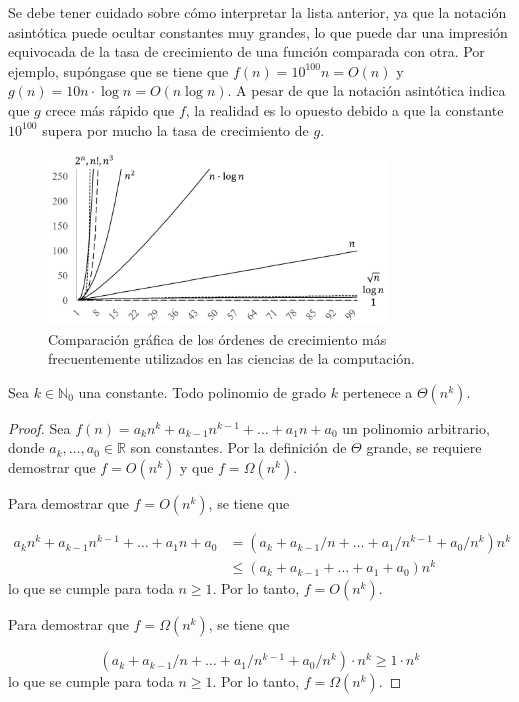 Se debe tener cuidado sobre cómo interpretar la lista anterior, ya
que la notación asintótica puede ocultar constantes muy grandes, lo
que puede dar una impresión equivocada de la tasa de crecimiento
de una función comparada con otra. 
Por ejemplo, supóngase que se tiene que $f(n)=10^{100}n=O(n)$
y $g(n)=10n\cdot\log n=O(n\log n)$. A pesar de que la notación
asintótica indica que $g$ crece más rápido que $f$, la realidad
es lo opuesto debido a que la constante $10^{100}$ supera por mucho 
la tasa de crecimiento de $g$.

\begin{figure}[tb]
    \begin{centering}
        \includegraphics[width=0.8\textwidth]{figuras/ordenes}
    \par\end{centering}
    \caption{{\small{}Comparación gráfica de los órdenes de crecimiento más frecuentemente
    utilizados en las ciencias de la computación.}}
\end{figure}

\begin{thm}
    Sea $k\in\mathbb{N}_{0}$ una constante. Todo polinomio de grado $k$
    pertenece a $\Theta(n^{k})$.
\end{thm}

\begin{proof}
    Sea $f(n)=a_{k}n^{k}+a_{k-1}n^{k-1}+\dots+a_{1}n+a_{0}$ un polinomio
    arbitrario, donde $a_k,\dots,a_{0}\in\mathbb{R}$ son constantes.
    Por la definición de $\Theta$ grande, se requiere demostrar que $f=O(n^{k})$
    y que $f=\Omega(n^{k})$. 
    
    Para demostrar que $f=O(n^{k})$, se tiene que 
    
    \begin{align*}
        a_{k}n^{k}+a_{k-1}n^{k-1}+\dots+a_{1}n+a_{0} &= (a_{k}+a_{k-1}/n+\dots+a_{1}/n^{k-1}+a_{0}/n^{k})n^{k}\\
        &\leq(a_{k}+a_{k-1}+\dots+a_{1}+a_{0})n^{k}
    \end{align*}
    lo que se cumple para toda $n\geq1$. Por lo tanto, $f=O(n^{k})$.
    
    Para demostrar que $f=\Omega(n^{k})$, se tiene que 
    
    \[
        (a_{k}+a_{k-1}/n+\dots+a_{1}/n^{k-1}+a_{0}/n^{k})\cdot n^{k}\geq1\cdot n^{k}
    \]
    lo que se cumple para toda $n\geq1$. Por lo tanto, $f=\Omega(n^{k})$.
\end{proof}

